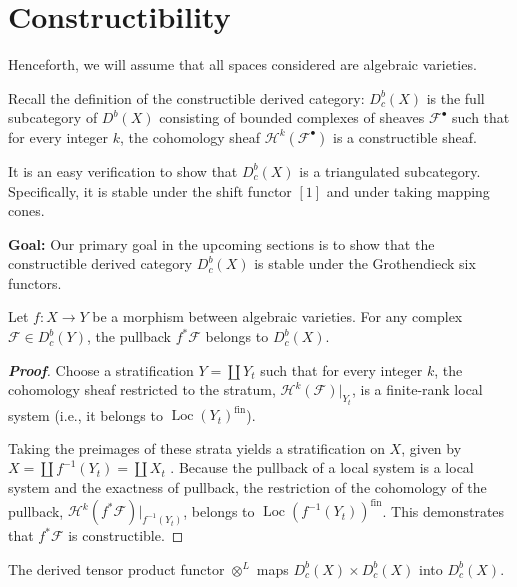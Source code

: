 \section{Constructibility}

\begin{remark}
    Henceforth, we will assume that all spaces considered are algebraic varieties.
\end{remark}

Recall the definition of the constructible derived category: $D_c^b(X)$ is the full subcategory of $D^b(X)$ consisting of bounded complexes of sheaves $\mathcal{F}^\bullet$ such that for every integer $k$, the cohomology sheaf $\mathcal{H}^k(\mathcal{F}^\bullet)$ is a constructible sheaf.

It is an easy verification to show that $D_c^b(X)$ is a triangulated subcategory. Specifically, it is stable under the shift functor $[1]$ and under taking mapping cones.

\textbf{Goal:} Our primary goal in the upcoming sections is to show that the constructible derived category $D_c^b(X)$ is stable under the Grothendieck six functors.

\begin{proposition}
Let $f \colon X \longrightarrow Y$ be a morphism between algebraic varieties. For any complex $\mathcal{F} \in D^b_c(Y)$, the pullback $f^* \mathcal{F}$ belongs to $D^b_c(X)$.
\end{proposition}

\begin{proof}[\textbf{Proof}]
Choose a stratification $Y = \coprod Y_t$ such that for every integer $k$, the cohomology sheaf restricted to the stratum, $\mathcal{H}^k(\mathcal{F})|_{Y_t}$, is a finite-rank local system (i.e., it belongs to $\operatorname{Loc}(Y_t)^{\text{fin}}$). 

Taking the preimages of these strata yields a stratification on $X$, given by $X = \coprod f^{-1}(Y_t) = \coprod X_t$ . Because the pullback of a local system is a local system and the exactness of pullback, the restriction of the cohomology of the pullback, $\mathcal{H}^k(f^* \mathcal{F})|_{f^{-1}(Y_t)}$, belongs to $\operatorname{Loc}(f^{-1}(Y_t))^{\text{fin}}$. This demonstrates that $f^* \mathcal{F}$ is constructible.
\end{proof}

\begin{proposition}
The derived tensor product functor $\otimes^{L}$ maps $D^b_c(X) \times D^b_c(X)$ into $D^b_c(X)$.
\end{proposition}

